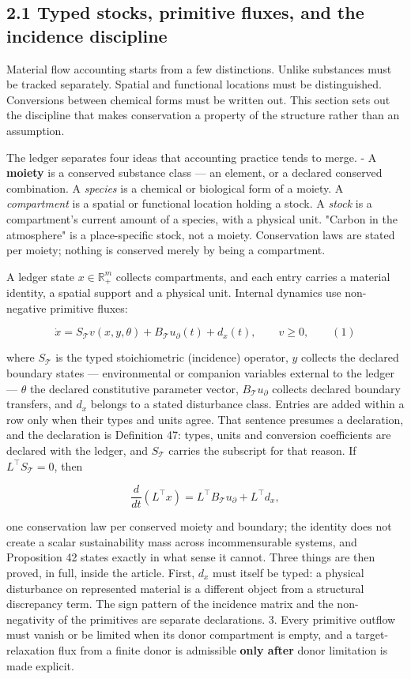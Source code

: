 \documentclass[11pt]{article}
\begin{document}
\subsection*{2.1 Typed stocks, primitive fluxes, and the incidence discipline}\label{21-typed-stocks-primitive-fluxes-and-the-incidence-discipline}

Material flow accounting starts from a few distinctions. Unlike substances must be tracked separately. Spatial and functional locations must be distinguished. Conversions between chemical forms must be written out. This section sets out the discipline that makes conservation a property of the structure rather than an assumption.

The ledger separates four ideas that accounting practice tends to merge. - A \textbf{moiety} is a conserved substance class --- an element, or a declared conserved combination. A \emph{species} is a chemical or biological form of a moiety. A \emph{compartment} is a spatial or functional location holding a stock. A \emph{stock} is a compartment's current amount of a species, with a physical unit. "Carbon in the atmosphere" is a place-specific stock, not a moiety. Conservation laws are stated per moiety; nothing is conserved merely by being a compartment.

A ledger state \(x\in\mathbb{R}^m_+\) collects compartments, and each entry carries a material identity, a spatial support and a physical unit. Internal dynamics use non-negative primitive fluxes: 

$$\dot x = S_{\mathcal{T}} v(x, y, \theta) + B_{\mathcal{T}} u_{\partial}(t) + d_x(t), \qquad v \ge 0, \qquad (1)$$

 where \(S_{\mathcal{T}}\) is the typed stoichiometric (incidence) operator, \(y\) collects the declared boundary states --- environmental or companion variables external to the ledger --- \(\theta\) the declared constitutive parameter vector, \(B_{\mathcal{T}} u_{\partial}\) collects declared boundary transfers, and \(d_x\) belongs to a stated disturbance class. Entries are added within a row only when their types and units agree. That sentence presumes a declaration, and the declaration is Definition 47: types, units and conversion coefficients are declared with the ledger, and \(S_{\mathcal{T}}\) carries the subscript for that reason. If \(L^\top S_{\mathcal{T}} = 0\), then 

$$\frac{d}{dt}(L^\top x) = L^\top B_{\mathcal{T}} u_{\partial} + L^\top d_x,$$

 one conservation law per conserved moiety and boundary; the identity does not create a scalar sustainability mass across incommensurable systems, and Proposition 42 states exactly in what sense it cannot. Three things are then proved, in full, inside the article. First, \(d_x\) must itself be typed: a physical disturbance on represented material is a different object from a structural discrepancy term. The sign pattern of the incidence matrix and the non-negativity of the primitives are separate declarations. 3. Every primitive outflow must vanish or be limited when its donor compartment is empty, and a target-relaxation flux from a finite donor is admissible \textbf{only after} donor limitation is made explicit.
\end{document}
